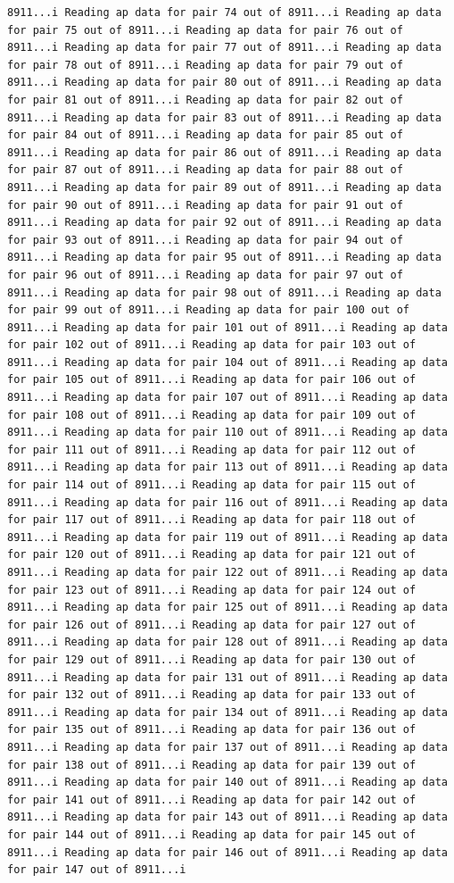 \documentclass[
]{article}
\begin{document}
\begin{verbatim}
8911...i Reading ap data for pair 74 out of 8911...i Reading ap data for pair 75 out of 8911...i Reading ap data for pair 76 out of 8911...i Reading ap data for pair 77 out of 8911...i Reading ap data for pair 78 out of 8911...i Reading ap data for pair 79 out of 8911...i Reading ap data for pair 80 out of 8911...i Reading ap data for pair 81 out of 8911...i Reading ap data for pair 82 out of 8911...i Reading ap data for pair 83 out of 8911...i Reading ap data for pair 84 out of 8911...i Reading ap data for pair 85 out of 8911...i Reading ap data for pair 86 out of 8911...i Reading ap data for pair 87 out of 8911...i Reading ap data for pair 88 out of 8911...i Reading ap data for pair 89 out of 8911...i Reading ap data for pair 90 out of 8911...i Reading ap data for pair 91 out of 8911...i Reading ap data for pair 92 out of 8911...i Reading ap data for pair 93 out of 8911...i Reading ap data for pair 94 out of 8911...i Reading ap data for pair 95 out of 8911...i Reading ap data for pair 96 out of 8911...i Reading ap data for pair 97 out of 8911...i Reading ap data for pair 98 out of 8911...i Reading ap data for pair 99 out of 8911...i Reading ap data for pair 100 out of 8911...i Reading ap data for pair 101 out of 8911...i Reading ap data for pair 102 out of 8911...i Reading ap data for pair 103 out of 8911...i Reading ap data for pair 104 out of 8911...i Reading ap data for pair 105 out of 8911...i Reading ap data for pair 106 out of 8911...i Reading ap data for pair 107 out of 8911...i Reading ap data for pair 108 out of 8911...i Reading ap data for pair 109 out of 8911...i Reading ap data for pair 110 out of 8911...i Reading ap data for pair 111 out of 8911...i Reading ap data for pair 112 out of 8911...i Reading ap data for pair 113 out of 8911...i Reading ap data for pair 114 out of 8911...i Reading ap data for pair 115 out of 8911...i Reading ap data for pair 116 out of 8911...i Reading ap data for pair 117 out of 8911...i Reading ap data for pair 118 out of 8911...i Reading ap data for pair 119 out of 8911...i Reading ap data for pair 120 out of 8911...i Reading ap data for pair 121 out of 8911...i Reading ap data for pair 122 out of 8911...i Reading ap data for pair 123 out of 8911...i Reading ap data for pair 124 out of 8911...i Reading ap data for pair 125 out of 8911...i Reading ap data for pair 126 out of 8911...i Reading ap data for pair 127 out of 8911...i Reading ap data for pair 128 out of 8911...i Reading ap data for pair 129 out of 8911...i Reading ap data for pair 130 out of 8911...i Reading ap data for pair 131 out of 8911...i Reading ap data for pair 132 out of 8911...i Reading ap data for pair 133 out of 8911...i Reading ap data for pair 134 out of 8911...i Reading ap data for pair 135 out of 8911...i Reading ap data for pair 136 out of 8911...i Reading ap data for pair 137 out of 8911...i Reading ap data for pair 138 out of 8911...i Reading ap data for pair 139 out of 8911...i Reading ap data for pair 140 out of 8911...i Reading ap data for pair 141 out of 8911...i Reading ap data for pair 142 out of 8911...i Reading ap data for pair 143 out of 8911...i Reading ap data for pair 144 out of 8911...i Reading ap data for pair 145 out of 8911...i Reading ap data for pair 146 out of 8911...i Reading ap data for pair 147 out of 8911...i 
\end{verbatim}
\end{document}
